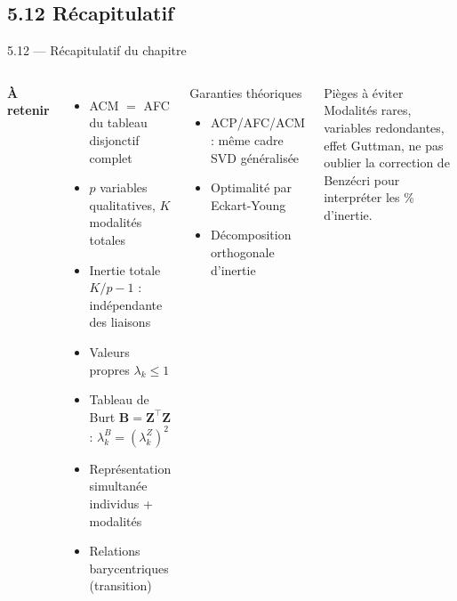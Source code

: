 \subsection{5.12 Récapitulatif}
\begin{frame}{5.12 — Récapitulatif du chapitre}
\begin{columns}[T]
\textbf{À retenir}
\begin{itemize}\small
  \item ACM $=$ AFC du \alert{tableau disjonctif complet}
  \item $p$ variables qualitatives, $K$ modalités totales
  \item Inertie totale $K/p - 1$ : indépendante des liaisons
  \item Valeurs propres $\lambda_k \leq 1$
  \item Tableau de Burt $\mathbf{B} = \mathbf{Z}^\top \mathbf{Z}$ : $\lambda_k^B = (\lambda_k^Z)^2$
  \item Représentation simultanée individus + modalités
  \item Relations barycentriques (transition)
\end{itemize}

\begin{block}{Garanties théoriques}
\begin{itemize}\small
  \item ACP/AFC/ACM : même cadre SVD généralisée
  \item Optimalité par Eckart-Young
  \item Décomposition orthogonale d'inertie
\end{itemize}
\end{block}

\begin{alertblock}{Pièges à éviter}
\small Modalités rares, variables redondantes, effet Guttman, ne pas oublier
la correction de Benzécri pour interpréter les \% d'inertie.
\end{alertblock}
\end{columns}
\end{frame}
